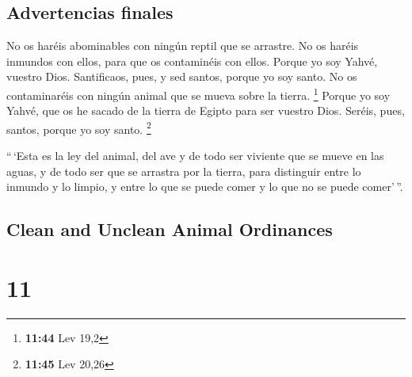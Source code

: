 \begin{paracol}{2}
\hypertarget{advertencias-finales}{%
\subsection{Advertencias finales}\label{advertencias-finales}}

 No os haréis abominables con ningún reptil que se
arrastre. No os haréis inmundos con ellos, para que os contaminéis con
ellos.  Porque yo soy Yahvé, vuestro Dios. Santificaos,
pues, y sed santos, porque yo soy santo. No os contaminaréis con ningún
animal que se mueva sobre la tierra. \footnote{\textbf{11:44} Lev 19,2}
 Porque yo soy Yahvé, que os he sacado de la tierra de
Egipto para ser vuestro Dios. Seréis, pues, santos, porque yo soy santo.
\footnote{\textbf{11:45} Lev 20,26}

 ``\,`Esta es la ley del animal, del ave y de todo ser
viviente que se mueve en las aguas, y de todo ser que se arrastra por la
tierra,  para distinguir entre lo inmundo y lo limpio, y
entre lo que se puede comer y lo que no se puede comer'\,''.

\switchcolumn
\begin{otherlanguage}{english}

\hypertarget{clean-and-unclean-animal-ordinances}{%
\subsection{Clean and Unclean Animal
Ordinances}\label{clean-and-unclean-animal-ordinances}}

\hypertarget{section-21}{%
\section{11}\label{section-21}}


\end{otherlanguage}
\end{paracol}
